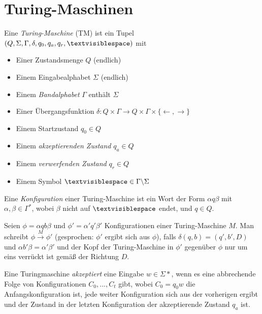 \documentclass{cheat-sheet}
\begin{document}


\section{Turing-Maschinen}

\begin{defn}
Eine \emph{Turing-Maschine} (TM) ist ein Tupel $(Q, \Sigma, \Gamma, \delta, q_{0}, q_{a}, q_{r}, \textvisiblespace)$ mit

\begin{itemize}{\leftmargin=0em}
  \setlength{\leftmargin}{0pt}
  \item Einer Zustandsmenge $Q$ (endlich)
  \item Einem Eingabealphabet $\Sigma$ (endlich)
  \item Einem \emph{Bandalphabet} $\Gamma$ enthält $\Sigma$
  \item Einer Übergangsfunktion $\delta : Q \times \Gamma \to Q \times \Gamma \times \{ \leftarrow, \rightarrow \} $
  \item Einem Startzustand $q_{0} \in Q$
  \item Einem \emph{akzeptierenden Zustand} $q_{a} \in Q$
  \item Einem \emph{verwerfenden Zustand} $q_{r} \in Q$
  \item Einem Symbol $\textvisiblespace \in \Gamma \backslash \Sigma$
\end{itemize}
\end{defn}

\begin{defn}
Eine \emph{Konfiguration} einer Turing-Maschine ist ein Wort der Form $\alpha q \beta$ mit $\alpha, \beta \in \Gamma^{*}$, wobei $\beta$ nicht auf $\textvisiblespace$ endet, und $q \in Q$.
\end{defn}

\begin{defn}
Seien $\phi = \alpha q b \beta$ und $\phi' = \alpha ' q' \beta '$ Konfigurationen einer Turing-Maschine $M$. Man schreibt $\phi \xrightarrow{M} \phi'$ (gesprochen: $\phi'$ ergibt sich aus $\phi$), falls $\delta(q, b) = (q', b', D)$ und $\alpha b' \beta = \alpha' \beta'$ und der Kopf der Turing-Maschine in $\phi'$ gegenüber $\phi$ nur um eins verrückt ist gemäß der Richtung $D$.
\end{defn}

\begin{defn}
Eine Turingmaschine \emph{akzeptiert} eine Eingabe $w \in \Sigma*$, wenn es eine abbrechende Folge von Konfigurationen $C_{0}, ..., C_{t}$ gibt, wobei $C_{0} = q_{0}w$ die Anfangskonfiguration ist, jede weiter Konfiguration sich aus der vorherigen ergibt und der Zustand in der letzten Konfiguration der akzeptierende Zustand $q_{a}$ ist.
\end{defn}
\end{document}
